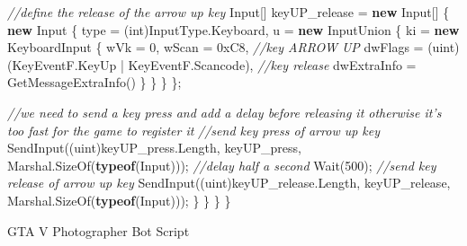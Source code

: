\documentclass[
  openany]{book}
\newenvironment{Shaded}{\begin{snugshade}}{\end{snugshade}}
\newcommand{\BaseNTok}[1]{\textcolor[rgb]{0.00,0.00,0.81}{#1}}
\newcommand{\CommentTok}[1]{\textcolor[rgb]{0.56,0.35,0.01}{\textit{#1}}}
\newcommand{\DataTypeTok}[1]{\textcolor[rgb]{0.13,0.29,0.53}{#1}}
\newcommand{\DecValTok}[1]{\textcolor[rgb]{0.00,0.00,0.81}{#1}}
\newcommand{\FunctionTok}[1]{\textcolor[rgb]{0.00,0.00,0.00}{#1}}
\newcommand{\KeywordTok}[1]{\textcolor[rgb]{0.13,0.29,0.53}{\textbf{#1}}}
\newcommand{\NormalTok}[1]{#1}
\begin{document}
\begin{Shaded}
\begin{Highlighting}[]
                \CommentTok{//define the release of the arrow up key}
\NormalTok{                Input[] keyUP_release = }\KeywordTok{new}\NormalTok{ Input[]}
\NormalTok{                \{}
                  \KeywordTok{new}\NormalTok{ Input}
\NormalTok{                  \{}
\NormalTok{                    type = (}\DataTypeTok{int}\NormalTok{)InputType.}\FunctionTok{Keyboard}\NormalTok{,}
\NormalTok{                    u = }\KeywordTok{new}\NormalTok{ InputUnion}
\NormalTok{                    \{}
\NormalTok{                      ki = }\KeywordTok{new}\NormalTok{ KeyboardInput}
\NormalTok{                      \{}
\NormalTok{                        wVk = }\DecValTok{0}\NormalTok{,}
\NormalTok{                        wScan = }\BaseNTok{0xC8}\NormalTok{, }\CommentTok{//key ARROW UP}
\NormalTok{                        dwFlags = (}\DataTypeTok{uint}\NormalTok{)(KeyEventF.}\FunctionTok{KeyUp}\NormalTok{ | KeyEventF.}\FunctionTok{Scancode}\NormalTok{), }\CommentTok{//key release}
\NormalTok{                        dwExtraInfo = }\FunctionTok{GetMessageExtraInfo}\NormalTok{()}
\NormalTok{                      \}}
\NormalTok{                    \}}
\NormalTok{                  \}}
\NormalTok{                \};}
                
                \CommentTok{//we need to send a key press and add a delay before releasing it otherwise it's too fast for the game to register it}
                \CommentTok{//send key press of arrow up key}
                \FunctionTok{SendInput}\NormalTok{((}\DataTypeTok{uint}\NormalTok{)keyUP_press.}\FunctionTok{Length}\NormalTok{, keyUP_press, Marshal.}\FunctionTok{SizeOf}\NormalTok{(}\KeywordTok{typeof}\NormalTok{(Input)));}
                \CommentTok{//delay half a second}
                \FunctionTok{Wait}\NormalTok{(}\DecValTok{500}\NormalTok{);}
                \CommentTok{//send key release of arrow up key}
                \FunctionTok{SendInput}\NormalTok{((}\DataTypeTok{uint}\NormalTok{)keyUP_release.}\FunctionTok{Length}\NormalTok{, keyUP_release, Marshal.}\FunctionTok{SizeOf}\NormalTok{(}\KeywordTok{typeof}\NormalTok{(Input)));}
\NormalTok{            \}}
\NormalTok{        \}}
\NormalTok{    \}}
\NormalTok{\}}
\end{Highlighting}
\end{Shaded}

GTA V Photographer Bot Script
\end{document}
